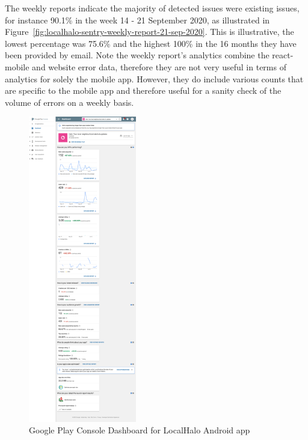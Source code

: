 The weekly reports indicate the majority of detected issues were existing issues, for instance 90.1\% in the week 14 - 21 September 2020, as illustrated in Figure~\ref{fig:localhalo-sentry-weekly-report-21-sep-2020}. This is illustrative, the lowest percentage was 75.6\% and the highest 100\% in the 16 months they have been provided by email. Note the weekly report's analytics combine the react-mobile and website error data, therefore they are not very useful in terms of analytics for solely the mobile app. However, they do include various counts that are specific to the mobile app and therefore useful for a sanity check of the volume of errors on a weekly basis.

\begin{figure}
  \begin{center}
    \includegraphics[width=0.42\textwidth]{images/google-play-console/resized-25pct-appdashboardplace_555059634831.png}
  \end{center}
  \caption{Google Play Console Dashboard for LocalHalo Android app}
  \label{fig:gpc-dashboard-for-localhalo-android-resized}
\end{figure}


